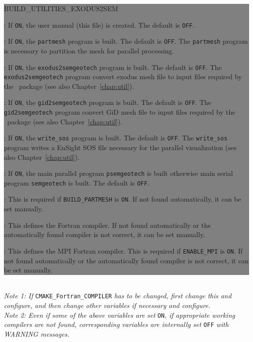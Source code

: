 \colorbox{gray}{
\parbox{15.5cm}{
\begin{adescription}{BUILD\_UTILITIES\_EXODUS2SEM}
\item[BUILD\_DOCUMENTATION]           : If \texttt{ON}, the user manual (this file) is created. The default is \texttt{OFF}.
\item[BUILD\_PARTMESH]                : If \texttt{ON}, the \texttt{partmesh} program is built. The default is \texttt{OFF}. The \texttt{partmesh} program is necessary to partition the mesh for parallel processing.
\item[BUILD\_EXODUS2SEMGEOTECH]   : If \texttt{ON}, the \texttt{exodus2semgeotech} program is built. The default is \texttt{OFF}. The \texttt{exodus2semgeotech} program convert exodus mesh file to input files required by the \pack\ package (see also Chapter~\ref{chap:util}).
\item[BUILD\_GID2SEMGEOTECH]   : If \texttt{ON}, the \texttt{gid2semgeotech} program is built. The default is \texttt{OFF}. The \texttt{gid2semgeotech} program convert GiD mesh file to input files required by the \pack\ package (see also Chapter~\ref{chap:util}).
\item[BUILD\_WRITE\_SOS]   : If \texttt{ON}, the \texttt{write\_sos} program is built. The default is \texttt{OFF}. The \texttt{write\_sos} program writes a EnSight SOS file necessary for the parallel visualization (see also Chapter~\ref{chap:util}).
\item[ENABLE\_MPI]                    : If \texttt{ON}, the main parallel program \texttt{psemgeotech} is built otherwise main serial program \texttt{semgeotech} is built. The default is \texttt{OFF}.
\item[SCOTCH\_LIBRARY\_PATH]          : This is required if \texttt{BUILD\_PARTMESH} is \texttt{ON}. If not found automatically, it can be set manually.
\item[CMAKE\_Fortran\_COMPILER]       : This defines the Fortran compiler. If not found automatically or the automatically found compiler is not correct, it can be set manually.
\item[MPI\_Fortran\_COMPILER]       : This defines the MPI Fortran compiler. This is required if \texttt{ENABLE\_MPI} is \texttt{ON}. If not found automatically or the automatically found compiler is not correct, it can be set manually.
\end{adescription}
}}\\

{\emph{Note 1: If}} \texttt{CMAKE\_Fortran\_COMPILER} {\emph{has to be changed, first change this and configure, and then change other variables if necessary and configure.}}\\
{\emph{Note 2: Even if some of the above variables are set }} \texttt{ON}{\emph{, if appropriate working compilers are not found, corresponding variables are internally set}} \texttt{OFF} {\emph{with WARNING messages.}}

